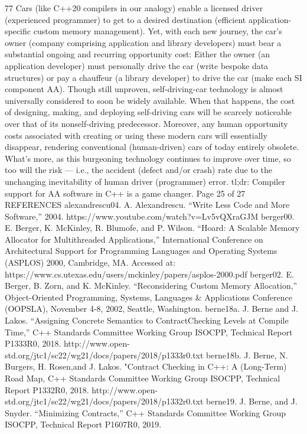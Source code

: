 77 Cars (like C++20 compilers in our analogy) enable a licensed driver (experienced programmer) to
get to a desired destination (efficient application-specific custom memory management). Yet, with
each new journey, the car’s owner (company comprising application and library developers) must
bear a substantial ongoing and recurring opportunity cost: Either the owner (an application
developer) must personally drive the car (write bespoke data structures) or pay a chauffeur (a library
developer) to drive the car (make each SI component AA). Though still unproven, self-driving-car
technology is almost universally considered to soon be widely available. When that happens, the cost
of designing, making, and deploying self-driving cars will be scarcely noticeable over that of its nonself-driving predecessor. Moreover, any human opportunity costs associated with creating or using
these modern cars will essentially disappear, rendering conventional (human-driven) cars of today
entirely obsolete. What's more, as this burgeoning technology continues to improve over time, so too
will the risk — i.e., the accident (defect and/or crash) rate due to the unchanging inevitability of
human driver (programmer) error. tl;dr: Compiler support for AA software in C++ is a game changer.
Page 25 of 27
REFERENCES
alexandrescu04. A. Alexandrescu. “Write Less Code and More Software,” 2004.
https://www.youtube.com/watch?v=Lv5vQXraGJM
berger00. E. Berger, K. McKinley, R. Blumofe, and P. Wilson. “Hoard: A Scalable
Memory Allocator for Multithreaded Applications,” International Conference on
Architectural Support for Programming Languages and Operating Systems
(ASPLOS) 2000, Cambridge, MA.
Accessed at:
https://www.cs.utexas.edu/users/mckinley/papers/asplos-2000.pdf
berger02. E. Berger, B. Zorn, and K. McKinley. “Reconsidering Custom Memory
Allocation,” Object-Oriented Programming, Systems, Languages & Applications
Conference (OOPSLA), November 4-8, 2002, Seattle, Washington.
berne18a. J. Berne and J. Lakos. “Assigning Concrete Semantics to ContractChecking Levels at Compile Time,” C++ Standards Committee Working Group
ISOCPP, Technical Report P1333R0, 2018.
http://www.open-std.org/jtc1/sc22/wg21/docs/papers/2018/p1333r0.txt
berne18b. J. Berne, N. Burgers, H. Rosen,and J. Lakos. "Contract Checking in C++:
A (Long-Term) Road Map, C++ Standards Committee Working Group ISOCPP,
Technical Report P1332R0, 2018.
http://www.open-std.org/jtc1/sc22/wg21/docs/papers/2018/p1332r0.txt
berne19. J. Berne, and J. Snyder. “Minimizing Contracts,” C++ Standards
Committee Working Group ISOCPP, Technical Report P1607R0, 2019.
